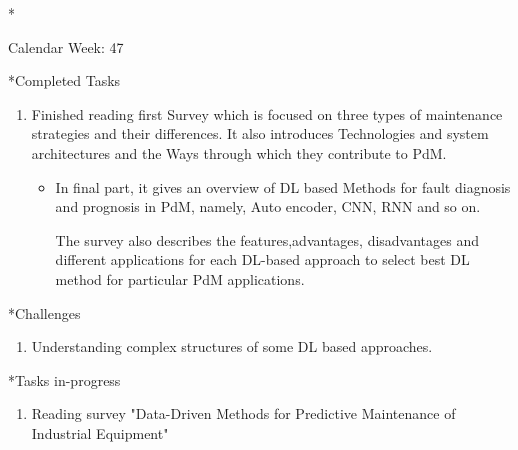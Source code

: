 \documentclass[11pt,a4paper]{article}
\begin{document}
\newpage
\begin{section}*{Calendar Week: 47 \hfill \date{20 November, 2020}}
 \begin{refsection}

       \begin{subsection}*{Completed Tasks}
             \begin{enumerate}
                   \item
                          Finished reading first Survey \cite{DBLP:journals/corr/abs-1912-07383}  which is focused on three types of maintenance strategies and their differences. It also introduces Technologies and system architectures and the Ways through which they contribute to PdM.
                         \begin{itemize}
                            \item In final part, it gives an overview of DL based Methods for fault diagnosis and prognosis in PdM, namely, Auto encoder, CNN, RNN and so on.
                            \par The survey also describes the features,advantages, disadvantages and different applications for each DL-based approach to select best DL method for particular PdM applications.
                        \end{itemize}
             \end{enumerate}
       \end{subsection}

       \begin{subsection}*{Challenges}
             \begin{enumerate}
                   \item
                         Understanding complex structures of some DL based approaches.
             \end{enumerate}
       \end{subsection}

       \begin{subsection}*{Tasks in-progress}
             \begin{enumerate}
                   \item
                        Reading survey "Data-Driven Methods for Predictive Maintenance of Industrial Equipment" \cite{DBLP:journals/sj/ZhangYW19}
             \end{enumerate}
       \end{subsection}

       \printbibliography
 \end{refsection}
\end{section}
\end{document}
